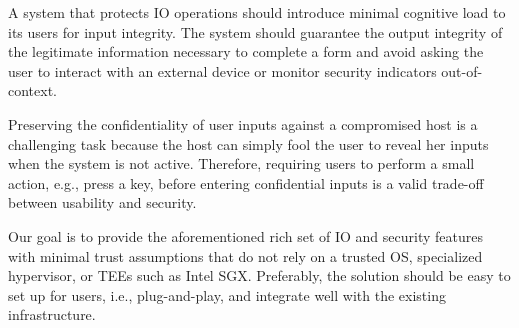 
A system that protects IO operations should introduce minimal cognitive load to its users for input integrity.
The system should guarantee the output integrity of the legitimate information necessary to complete a form and avoid asking the user to interact with an external device or monitor security indicators out-of-context.


Preserving the confidentiality of user inputs against a compromised host is a challenging task because the host can simply fool the user to reveal her inputs when the system is not active. Therefore, requiring users to perform a small action, e.g., press a key, before entering confidential inputs is a valid trade-off between usability and security.


Our goal is to provide the aforementioned rich set of IO and security features with minimal trust assumptions that do not rely on a trusted OS, specialized hypervisor, or TEEs such as Intel SGX. Preferably, the solution should be easy to set up for users, i.e., plug-and-play, and integrate well with the existing infrastructure.  
